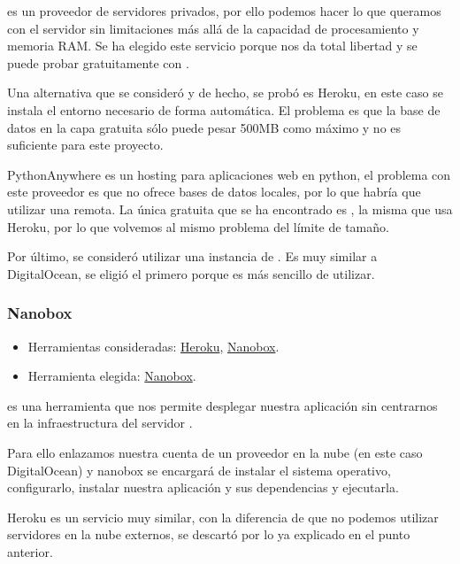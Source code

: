  es un proveedor de servidores privados, por ello podemos hacer lo que queramos con el servidor sin limitaciones más allá de la capacidad de procesamiento y memoria RAM. Se ha elegido este servicio porque nos da total libertad y se puede probar gratuitamente con  \cite{docs:digitalocean}.

Una alternativa que se consideró y de hecho, se probó es Heroku, en este caso se instala el entorno necesario de forma automática. El problema es que la base de datos en la capa gratuita sólo puede pesar 500MB como máximo y no es suficiente para este proyecto.

PythonAnywhere es un hosting para aplicaciones web en python, el problema con este proveedor es que no ofrece bases de datos locales, por lo que habría que utilizar una remota. La única gratuita que se ha encontrado es , la misma que usa Heroku, por lo que volvemos al mismo problema del límite de tamaño.

Por último, se consideró utilizar una instancia de . Es muy similar a DigitalOcean, se eligió el primero porque es más sencillo de utilizar.

\subsubsection{Nanobox} \label{nanobox}
\begin{itemize}
	\tightlist
	\item
	Herramientas consideradas:
	\href{https://www.heroku.com/}{Heroku}, 
	\href{https://nanobox.io/}{Nanobox}.
	\item
	Herramienta elegida:
	\href{https://nanobox.io/}{Nanobox}.
\end{itemize}

 es una herramienta que nos permite desplegar nuestra aplicación sin centrarnos en la infraestructura del servidor \cite{docs:nanobox}.

Para ello enlazamos nuestra cuenta de un proveedor en la nube (en este caso DigitalOcean) y nanobox se encargará de instalar el sistema operativo, configurarlo, instalar nuestra aplicación y sus dependencias y ejecutarla.

Heroku es un servicio muy similar, con la diferencia de que no podemos utilizar servidores en la nube externos, se descartó por lo ya explicado en el punto anterior.

